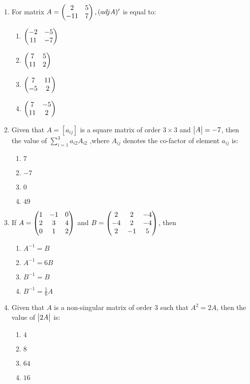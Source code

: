 \documentclass{article}
\begin{document}
\begin{enumerate}
    \item For matrix $A = \begin{pmatrix}2 & 5 \\ -11 & 7\end{pmatrix}, (adj A)'$ is equal to:
    \begin{enumerate}
        \item $\begin{pmatrix}-2 & -5 \\ 11 & -7\end{pmatrix}$
        \item $\begin{pmatrix}7 & 5 \\ 11 & 2\end{pmatrix}$
        \item $\begin{pmatrix}7 & 11 \\ -5 & 2\end{pmatrix}$
        \item $\begin{pmatrix}7 & -5 \\ 11 & 2\end{pmatrix}$
    \end{enumerate}

    \item Given that $A = [a_{ij}]$ is a square matrix of order $3 \times 3$ and $\begin{vmatrix}A\end{vmatrix} = -7$, then the value of  $\sum_{i=1}^{3} a_{i2}A_{i2}$ ,where $A_{ij}$ denotes the co-factor of element $a_{ij}$ is:

    \begin{enumerate}
        \item $7$
        \item $-7$
        \item $0$
        \item $49$
    \end{enumerate}

    \item If $A =\begin{pmatrix}1 &-1 & 0 \\2&3 & 4 \\0&1&2\end{pmatrix}$ and $B = \begin{pmatrix}2&2&-4\\-4&2&-4\\2&-1&5\end{pmatrix}$, then
    \begin{enumerate}
        \item $A^{-1} = B$
        \item $A^{-1} = 6B$
        \item $B^{-1} = B$
        \item $B^{-1} = \frac{1}{6} A$
    \end{enumerate}
    
    \item Given that $A$ is a non-singular matrix of order $3$ such that $A^2 = 2A$, then the value of $\begin{vmatrix}2A\end{vmatrix}$ is:
    \begin{enumerate}
        \item $4$
        \item $8$
        \item $64$
        \item $16$
    \end{enumerate}


\end{enumerate}
\end{document}
